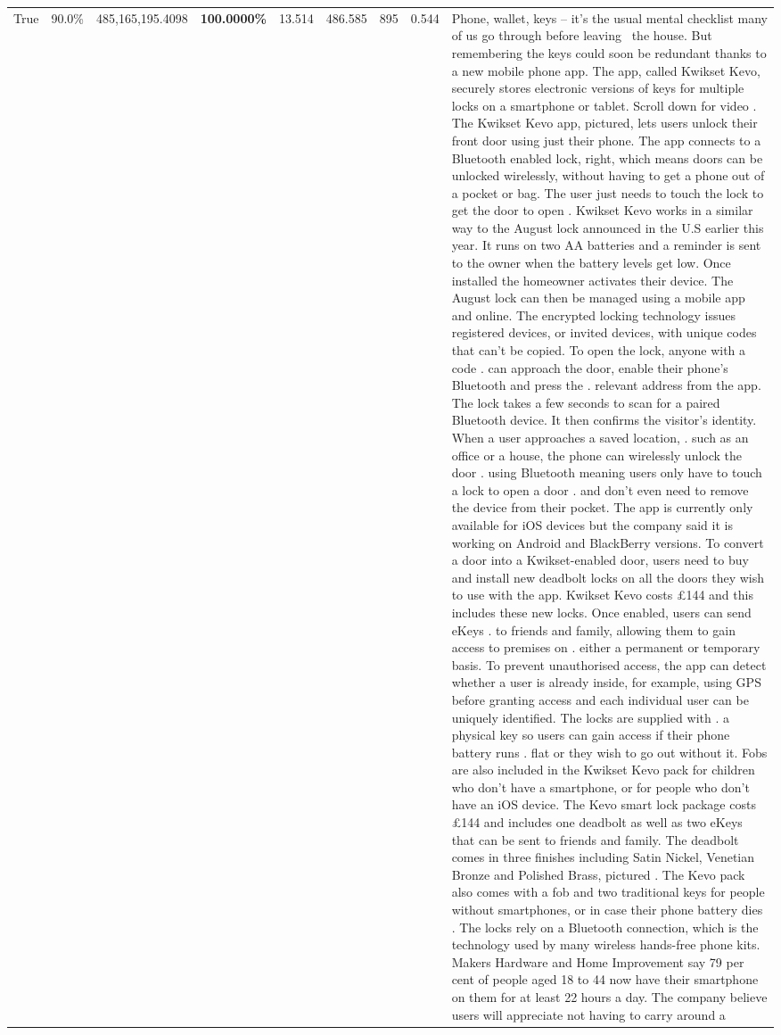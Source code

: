 \begin{table}[H]
\begin{tabular}{lllrlllll}
True & 90.0\% & 485,165,195.4098 & \bfseries \color{red} 100.0000\% & 13.514 & 486.585 & 895 & 0.544 & Phone, wallet, keys – it’s the usual mental checklist many of us go through before leaving  the house. But remembering the keys could soon be redundant thanks to a new mobile phone app. The app, called Kwikset Kevo, securely stores electronic versions of keys for multiple locks on a smartphone or tablet. Scroll down for video . The Kwikset Kevo app, pictured, lets users unlock their front door using just their phone. The app connects to a Bluetooth enabled lock, right, which means doors can be unlocked wirelessly, without having to get a phone out of a pocket or bag. The user just needs to touch the lock to get the door to open . Kwikset Kevo works in a similar way to the August lock announced in the U.S earlier this year. It runs on two AA batteries and a reminder is sent to the owner when the battery levels get low. Once installed the homeowner activates their device. The August lock can then be managed using a mobile app and online. The encrypted locking technology issues registered devices, or invited devices, with unique codes that can't be copied. To open the lock, anyone with a code . can approach the door, enable their phone's Bluetooth and press the . relevant address from the app. The lock takes a few seconds to scan for a paired Bluetooth device. It then confirms the visitor's identity. When a user approaches a saved location, . such as an office or a house, the phone can wirelessly unlock the door . using Bluetooth meaning users only have to touch a lock to open a door . and don't even need to remove the device from their pocket. The app is currently only available for iOS devices but the company said it is working on Android and BlackBerry versions. To convert a door into a Kwikset-enabled door, users need to buy and install new deadbolt locks on all the doors they wish to use with the app. Kwikset Kevo costs £144 and this includes these new locks. Once enabled, users can send eKeys . to friends and family, allowing them to gain access to premises on . either a permanent or temporary basis. To prevent unauthorised access, the app can detect whether a user is already inside, for example, using GPS before granting access and each individual user can be uniquely identified. The locks are supplied with . a physical key so users can gain access if their phone battery runs . flat or they wish to go out without it. Fobs are also included in the Kwikset Kevo pack for children who don't have a smartphone, or for people who don't have an iOS device. The Kevo smart lock package costs £144 and includes one deadbolt as well as two eKeys that can be sent to friends and family. The deadbolt comes in three finishes including Satin Nickel, Venetian Bronze and Polished Brass, pictured . The Kevo pack also comes with a fob and two traditional keys for people without smartphones, or in case their phone battery dies . The locks rely on a Bluetooth connection, which is the technology used by many wireless hands-free phone kits. Makers Hardware and Home Improvement say 79 per cent of people aged 18 to 44 now have their smartphone on them for at least 22 hours a day. The company believe users will appreciate not having to carry around a 
\end{tabular}
\end{table}

